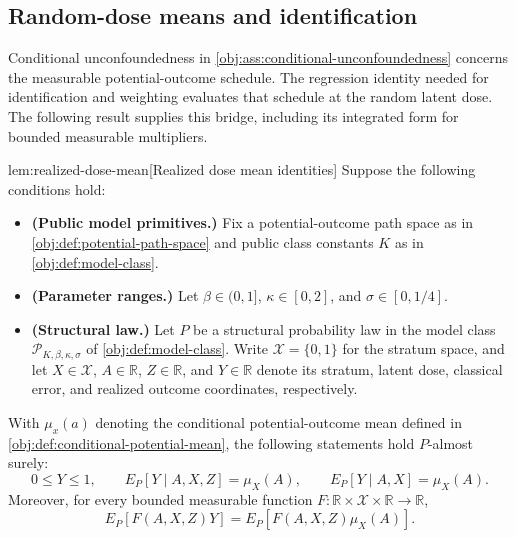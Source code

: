 \documentclass[11pt]{article}
\begin{document}
\subsection{Random-dose means and identification}

Conditional unconfoundedness in \cref{obj:ass:conditional-unconfoundedness} concerns the measurable potential-outcome schedule. The regression identity needed for identification and weighting evaluates that schedule at the random latent dose. The following result supplies this bridge, including its integrated form for bounded measurable multipliers.

\begin{lemmav}{lem:realized-dose-mean}[Realized dose mean identities]
Suppose the following conditions hold:
\begin{itemize}
\item \textbf{(Public model primitives.)} Fix a potential-outcome path space as in \cref{obj:def:potential-path-space} and public class constants \(K\) as in \cref{obj:def:model-class}.
\item \textbf{(Parameter ranges.)} Let \(\beta\in(0,1]\), \(\kappa\in[0,2]\), and \(\sigma\in[0,1/4]\).
\item \textbf{(Structural law.)} Let \(P\) be a structural probability law in the model class \(\mathcal P_{K,\beta,\kappa,\sigma}\) of \cref{obj:def:model-class}. Write \(\mathcal X=\{0,1\}\) for the stratum space, and let \(X\in\mathcal X\), \(A\in\mathbb R\), \(Z\in\mathbb R\), and \(Y\in\mathbb R\) denote its stratum, latent dose, classical error, and realized outcome coordinates, respectively.
\end{itemize}
With \(\mu_x(a)\) denoting the conditional potential-outcome mean defined in \cref{obj:def:conditional-potential-mean}, the following statements hold \(P\)-almost surely:
\[
0\le Y\le1,\qquad
E_P[Y\mid A,X,Z]=\mu_X(A),\qquad
E_P[Y\mid A,X]=\mu_X(A).
\]
Moreover, for every bounded measurable function
\(F:\mathbb R\times\mathcal X\times\mathbb R\to\mathbb R\),
\[
E_P\!\left[F(A,X,Z)Y\right]
=
E_P\!\left[F(A,X,Z)\mu_X(A)\right].
\]
\end{lemmav}
\end{document}
